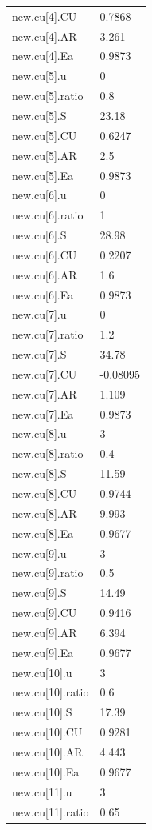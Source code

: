 {\begin{longtable}{p{}p{}}
{}new.cu[4].CU & 0.7868\\
{}new.cu[4].AR & 3.261\\
{}new.cu[4].Ea & 0.9873\\
{}new.cu[5].u & 0\\
{}new.cu[5].ratio & 0.8\\
{}new.cu[5].S & 23.18\\
{}new.cu[5].CU & 0.6247\\
{}new.cu[5].AR & 2.5\\
{}new.cu[5].Ea & 0.9873\\
{}new.cu[6].u & 0\\
{}new.cu[6].ratio & 1\\
{}new.cu[6].S & 28.98\\
{}new.cu[6].CU & 0.2207\\
{}new.cu[6].AR & 1.6\\
{}new.cu[6].Ea & 0.9873\\
{}new.cu[7].u & 0\\
{}new.cu[7].ratio & 1.2\\
{}new.cu[7].S & 34.78\\
{}new.cu[7].CU & -0.08095\\
{}new.cu[7].AR & 1.109\\
{}new.cu[7].Ea & 0.9873\\
{}new.cu[8].u & 3\\
{}new.cu[8].ratio & 0.4\\
{}new.cu[8].S & 11.59\\
{}new.cu[8].CU & 0.9744\\
{}new.cu[8].AR & 9.993\\
{}new.cu[8].Ea & 0.9677\\
{}new.cu[9].u & 3\\
{}new.cu[9].ratio & 0.5\\
{}new.cu[9].S & 14.49\\
{}new.cu[9].CU & 0.9416\\
{}new.cu[9].AR & 6.394\\
{}new.cu[9].Ea & 0.9677\\
{}new.cu[10].u & 3\\
{}new.cu[10].ratio & 0.6\\
{}new.cu[10].S & 17.39\\
{}new.cu[10].CU & 0.9281\\
{}new.cu[10].AR & 4.443\\
{}new.cu[10].Ea & 0.9677\\
{}new.cu[11].u & 3\\
{}new.cu[11].ratio & 0.65\\

\end{longtable}}

